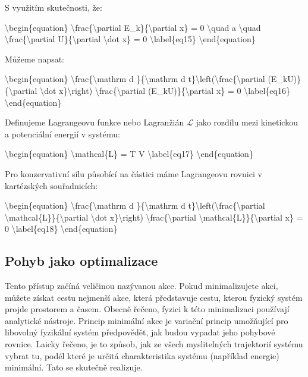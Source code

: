\documentclass[letterpaper,10pt,english]{jupyterBook}
\begin{document}
\sphinxAtStartPar
S využitím skutečnosti, že:

\sphinxAtStartPar
\textbackslash{}begin\{equation\}
\textbackslash{}frac\{\textbackslash{}partial E\_k\}\{\textbackslash{}partial x\} = 0 \textbackslash{}quad a \textbackslash{}quad \textbackslash{}frac\{\textbackslash{}partial U\}\{\textbackslash{}partial \textbackslash{}dot x\} = 0
\textbackslash{}label\{eq15\}
\textbackslash{}end\{equation\}

\sphinxAtStartPar
Můžeme napsat:

\sphinxAtStartPar
\textbackslash{}begin\{equation\}
\textbackslash{}frac\{\textbackslash{}mathrm d \}\{\textbackslash{}mathrm d t\}\textbackslash{}left(\textbackslash{}frac\{\textbackslash{}partial (E\_k\sphinxhyphen{}U)\}\{\textbackslash{}partial \textbackslash{}dot x\}\textbackslash{}right) \sphinxhyphen{} \textbackslash{}frac\{\textbackslash{}partial (E\_k\sphinxhyphen{}U)\}\{\textbackslash{}partial x\} = 0
\textbackslash{}label\{eq16\}
\textbackslash{}end\{equation\}

\sphinxAtStartPar
Definujeme Lagrangeovu funkce nebo Lagranžián \(\mathcal{L}\) jako rozdílu mezi kinetickou a potenciální energií v systému:

\sphinxAtStartPar
\textbackslash{}begin\{equation\}
\textbackslash{}mathcal\{L\} = T \sphinxhyphen{} V
\textbackslash{}label\{eq17\}
\textbackslash{}end\{equation\}

\sphinxAtStartPar
Pro konzervativní sílu působící na částici máme Lagrangeovu rovnici v kartézských souřadnicích:

\sphinxAtStartPar
\textbackslash{}begin\{equation\}
\textbackslash{}frac\{\textbackslash{}mathrm d \}\{\textbackslash{}mathrm d t\}\textbackslash{}left(\textbackslash{}frac\{\textbackslash{}partial \textbackslash{}mathcal\{L\}\}\{\textbackslash{}partial \textbackslash{}dot x\}\textbackslash{}right) \sphinxhyphen{} \textbackslash{}frac\{\textbackslash{}partial \textbackslash{}mathcal\{L\}\}\{\textbackslash{}partial x\} = 0
\textbackslash{}label\{eq18\}
\textbackslash{}end\{equation\}


\subsection{Pohyb jako optimalizace}
\label{\detokenize{Prednasky/1_5_Lagrange_Eulerovy_rovnice:pohyb-jako-optimalizace}}
\sphinxAtStartPar
Tento přístup začíná veličinou nazývanou akce. Pokud minimalizujete akci, můžete získat cestu nejmenší akce, která představuje cestu, kterou fyzický systém projde prostorem a časem. Obecně řečeno, fyzici k této minimalizaci používají analytické nástroje. Princip minimální akce je variační princip umožňující pro libovolný fyzikální systém předpovědět, jak budou vypadat jeho pohybové rovnice.
Laicky řečeno, je to způsob, jak ze všech myslitelných trajektorií systému vybrat tu, podél které je určitá charakteristika systému (například energie) minimální. Tato se skutečně realizuje.
\end{document}
